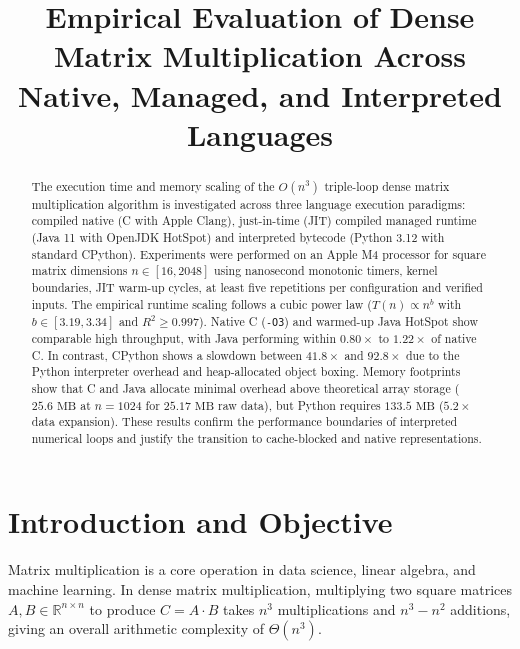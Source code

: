 \documentclass[10pt,conference,a4paper]{IEEEtran}
\begin{document}
\title{Empirical Evaluation of Dense Matrix Multiplication Across Native, Managed, and Interpreted Languages}

\author{
}

\maketitle

\begin{abstract}
The execution time and memory scaling of the $O(n^3)$ triple-loop dense matrix multiplication algorithm is investigated across three language execution paradigms: 
compiled native (C with Apple Clang), just-in-time (JIT) compiled managed runtime (Java 11 with OpenJDK HotSpot) and interpreted bytecode (Python 3.12 with standard CPython). 
Experiments were performed on an Apple M4 processor for square matrix dimensions $n \in [16, 2048]$ using nanosecond monotonic timers, kernel boundaries, JIT warm-up cycles, at least five repetitions per configuration and verified inputs. 
The empirical runtime scaling follows a cubic power law ($T(n) \propto n^b$ with $b \in [3.19, 3.34]$ and $R^2 \ge 0.997$). 
Native C (\texttt{-O3}) and warmed-up Java HotSpot show comparable high throughput, with Java performing within $0.80\times$ to $1.22\times$ of native C. 
In contrast, CPython shows a slowdown between $41.8\times$ and $92.8\times$ due to the Python interpreter overhead and heap-allocated object boxing. 
Memory footprints show that C and Java allocate minimal overhead above theoretical array storage ($25.6\text{ MB}$ at $n=1024$ for $25.17\text{ MB}$ raw data), but Python requires $133.5\text{ MB}$ ($5.2\times$ data expansion). 
These results confirm the performance boundaries of interpreted numerical loops and justify the transition to cache-blocked and native representations.
\end{abstract}

\section{Introduction and Objective}
Matrix multiplication is a core operation in data science, linear algebra, and machine learning. In dense matrix multiplication, multiplying two square matrices $A, B \in \mathbb{R}^{n \times n}$ to produce $C = A \cdot B$ takes $n^3$ multiplications and $n^3 - n^2$ additions, giving an overall arithmetic complexity of $\Theta(n^3)$.
\end{document}
